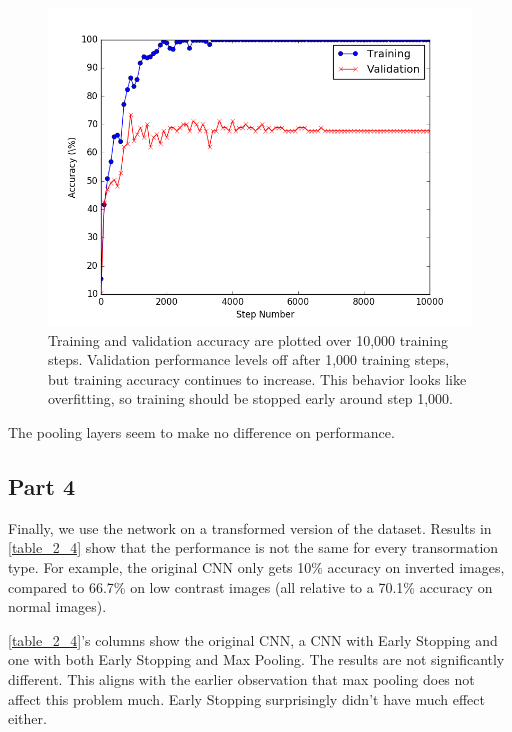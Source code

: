 \begin{figure}
	\centering
	\includegraphics [trim=0 0 0 0, clip, angle=0, width=0.8\columnwidth,
	keepaspectratio]{figures/2_3_num_steps}
	\caption{Training and validation accuracy are plotted over 10,000 training steps. Validation performance levels off after 1,000 training steps, but training accuracy continues to increase. This behavior looks like overfitting, so training should be stopped early around step 1,000.} 
	\label{fig:2_3_num_steps} 
\end{figure}

The pooling layers seem to make no difference on performance.

\subsection{Part 4}
Finally, we use the network on a transformed version of the dataset.
Results in \cref{table_2_4} show that the performance is not the same for every transormation type.
For example, the original CNN only gets 10\% accuracy on inverted images, compared to 66.7\% on low contrast images (all relative to a 70.1\% accuracy on normal images).

\cref{table_2_4}'s columns show the original CNN, a CNN with Early Stopping and one with both Early Stopping and Max Pooling.
The results are not significantly different.
This aligns with the earlier observation that max pooling does not affect this problem much.
Early Stopping surprisingly didn't have much effect either.


